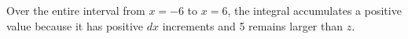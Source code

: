 Over the entire interval from $x = -6$ to $x = 6$, the integral accumulates a positive value because it has positive $dx$ increments and 5 remains larger than $z$.











